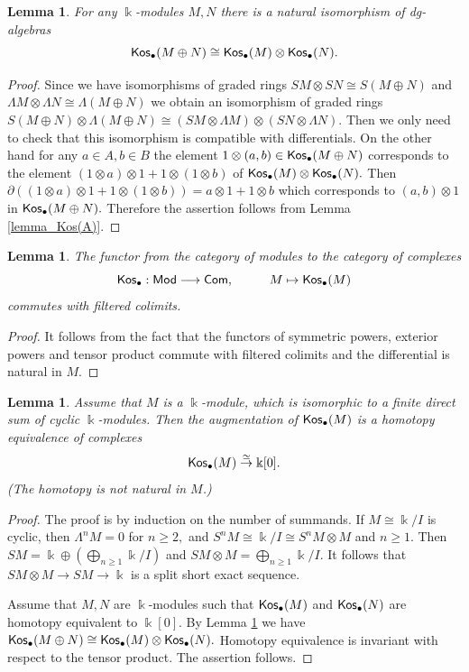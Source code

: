\documentclass{amsart}
\numberwithin{equation}{section}
\newtheorem{lemma}[theorem]{Lemma}
\theoremstyle{definition}
\def\kk{\Bbbk}
\begin{document}
\begin{lemma}\label{lemma_direct_summ_Kos} For any $\kk$-modules $M,N$ there is a natural isomorphism of dg-algebras
$${\sf Kos}_\bullet(M\oplus N)\cong {\sf Kos}_\bullet(M)\otimes {\sf Kos}_\bullet(N).$$
\end{lemma}
\begin{proof}
Since we have isomorphisms of graded rings $SM\otimes SN \cong S(M\oplus N)$ and $ \Lambda M\otimes \Lambda N\cong \Lambda(M\oplus N)$ we obtain an isomorphism of graded rings $S(M\oplus N) \otimes \Lambda(M\oplus N)\cong (SM\otimes \Lambda M)\otimes (SN \otimes \Lambda N).$ Then we only need to check that this isomorphism is compatible with differentials. On the other hand for any $a\in A,b\in B$ the element $1\otimes (a,b)\in {\sf Kos}_\bullet(M\oplus N)$ corresponds to the element $(1\otimes a)\otimes 1 +1\otimes (1\otimes b)$ of ${\sf Kos}_\bullet(M)\otimes {\sf Kos}_\bullet(N).$ Then $\partial((1\otimes a)\otimes 1 +1\otimes (1\otimes b))=a\otimes 1+ 1\otimes b$ which corresponds to $(a,b)\otimes 1$ in ${\sf Kos}_\bullet(M\oplus N).$ Therefore the assertion follows from Lemma \ref{lemma_Kos(A)}.
\end{proof}


\begin{lemma}\label{lemma_Kos_direct_lim} The functor from the category of modules to the category of complexes  
$${\sf Kos}_\bullet: {\sf Mod}\longrightarrow {\sf Com}, \hspace{1cm} M\mapsto {\sf Kos}_\bullet(M)$$
commutes with filtered colimits.
\end{lemma}
\begin{proof}
It follows from the fact that the functors of symmetric powers, exterior powers and tensor product commute with filtered colimits and the differential is natural in $M$.
\end{proof}


\begin{lemma}\label{lemma_Kos_contractible}
Assume that $M$ is a $\kk$-module, which is isomorphic to a finite direct sum of cyclic $\kk$-modules. Then the augmentation of ${\sf Kos}_\bullet(M)$ is a homotopy equivalence of complexes  $${\sf Kos}_\bullet(M)\overset{\simeq}\to \kk[0].$$
(The homotopy is not natural in $M$.) 
\end{lemma}
\begin{proof}  The proof is by induction on the number of summands.
If $M\cong \kk/I$ is cyclic, then $\Lambda^nM=0$ for $n\geq 2,$ and $S^nM\cong \kk/I\cong S^nM\otimes M$ and $n\geq 1.$ Then $SM=\kk\oplus \left(\bigoplus_{n\geq 1} \kk/I\right)$ and $SM\otimes M= \bigoplus_{n\geq 1} \kk/I.$ It follows that $ SM\otimes M \to SM\to \kk$ is a split short exact sequence. 

Assume that $M,N$ are $\kk$-modules such that ${\sf Kos}_\bullet(M)$  and ${\sf Kos}_\bullet(N)$ are homotopy equivalent to $\kk[0].$  By Lemma  \ref{lemma_direct_summ_Kos} we have ${\sf Kos}_\bullet(M\oplus N)\cong {\sf Kos}_\bullet(M)\otimes {\sf Kos}_\bullet(N).$ Homotopy equivalence is invariant with respect to the tensor product. The assertion follows.
\end{proof}
\end{document}
